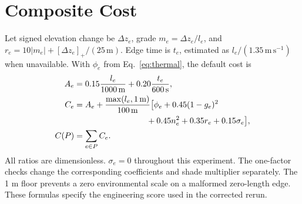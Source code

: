 \documentclass[sigconf,nonacm]{acmart}
\begin{document}
\section{Composite Cost}\label{app:cost}
Let signed elevation change be $\Delta z_e$, grade $m_e=\Delta z_e/l_e$, and $r_e=10|m_e|+[\Delta z_e]_+/(25\,\mathrm m)$. Edge time is $t_e$, estimated as $l_e/(1.35\,\mathrm{m\,s^{-1}})$ when unavailable. With $\phi_e$ from Eq.~\ref{eq:thermal}, the default cost is
\begin{align}
 A_e&=0.15\frac{l_e}{1000\,\mathrm m}+0.20\frac{t_e}{600\,\mathrm s},\\
 C_e&=A_e+\frac{\max(l_e,1\,\mathrm m)}{100\,\mathrm m}\bigl[\phi_e+0.45(1-g_e)^2\nonumber\\
 &\hspace{31mm}+0.45n_e^2+0.35r_e+0.15\sigma_e\bigr],\\
 C(P)&=\sum_{e\in P}C_e.
\end{align}
All ratios are dimensionless. $\sigma_e=0$ throughout this experiment. The one-factor checks change the corresponding coefficients and shade multiplier separately. The 1 m floor prevents a zero environmental scale on a malformed zero-length edge. These formulas specify the engineering score used in the corrected rerun.
\end{document}
